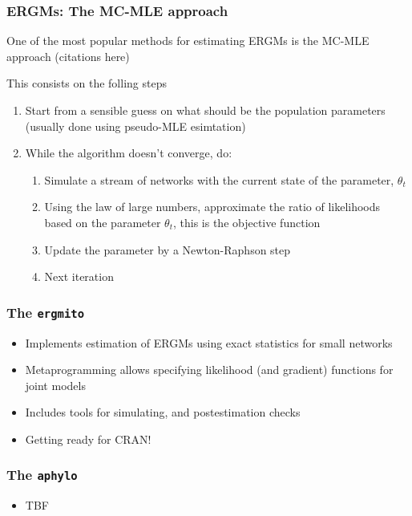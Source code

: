 \documentclass[aspectratio=169, 10pt]{beamer}\usepackage[]{graphicx}\usepackage[]{color}
\newcommand{\ergmitopkg}[0]{\texttt{ergmito}}
\newcommand{\aphylopkg}[0]{\texttt{aphylo}}
\begin{document}
\begin{frame}[label=mcmle]
\frametitle{ERGMs: The MC-MLE approach}

One of the most popular methods for estimating ERGMs is the MC-MLE approach (citations here)

This consists on the folling steps

\begin{enumerate}
\item Start from a sensible guess on what should be the population parameters
(usually done using pseudo-MLE esimtation)
\item While the algorithm doesn't converge, do:
  \begin{enumerate}
  \item Simulate a stream of networks with the current state of the parameter,
  $\theta_t$
  \item Using the law of large numbers, approximate the ratio of likelihoods 
  based on the parameter $\theta_t$, this is the objective function
  \item Update the parameter by a Newton-Raphson step
  \item Next iteration
  \end{enumerate}
\end{enumerate}

\hyperlink{art}{}


\end{frame}

\begin{frame}[label=ergmitopkg]
\frametitle{The \ergmitopkg{}}

\begin{itemize}
\item Implements estimation of ERGMs using exact statistics for small networks
\item Metaprogramming allows specifying likelihood (and gradient) functions for
joint models
\item Includes tools for simulating, and postestimation checks
\item Getting ready for CRAN!
\end{itemize}

\hyperlink{ergmito}{}

\end{frame}

\begin{frame}[label=aphylopkg]
\frametitle{The \aphylopkg{}}

\begin{itemize}
\item TBF
\end{itemize}

\hyperlink{aphylo}{}
\end{frame}
\end{document}
